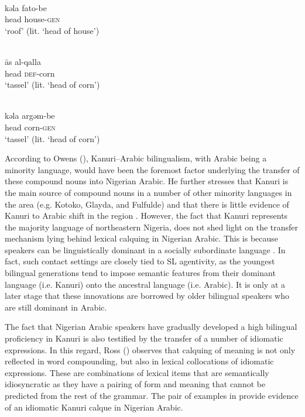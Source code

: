 \documentclass[output=paper]{langsci/langscibook}
\begin{document}
\\
\gll   kǝla fato-be   \\
       head house-\textsc{gen}\\
\glt   `roof' (lit. ‘head of house’)
\z
\z

\ea\label{ex:tassel}
\\
\gll   {\R}ās al-qalla  \\
       head \textsc{def}-corn\\
\glt   `tassel' (lit. ‘head of corn')

\\
\gll   kǝla argǝm-be \\
       head corn-\textsc{gen} \\
\glt   `tassel' (lit. ‘head of corn')
\z
\z

According to Owens (\citeyear[65]{Owens2016idioms}), Kanuri–Arabic bilingualism, with Arabic being a minority language, would have been the foremost factor underlying the transfer of these compound nouns into Nigerian Arabic. He further stresses that Kanuri is the main source of compound nouns in a number of other minority languages in the area (e.g. Kotoko, Glayda, and Fulfulde) and that there is little evidence of Kanuri to Arabic shift in the region \citep[147]{Owens2014}. However, the fact that Kanuri represents the majority language of northeastern Nigeria, does not shed light on the transfer mechanism lying behind lexical calquing in Nigerian Arabic. This is because speakers can be linguistically dominant in a socially subordinate language \citep[376]{Winford2005}. In fact, such contact settings are closely tied to SL agentivity, as the youngest bilingual generations tend to impose semantic features from their dominant language (i.e. Kanuri) onto the ancestral language (i.e. Arabic). It is only at a later stage that these innovations are borrowed by older bilingual speakers who are still dominant in Arabic. 

The fact that Nigerian Arabic speakers have gradually developed a high bilingual proficiency in Kanuri is also testified by the transfer of a number of idiomatic expressions. In this regard, Ross (\citeyear[122]{Ross2007}) observes that calquing of meaning is not only reflected in word compounding, but also in lexical collocations of idiomatic expressions. These are combinations of lexical items that are semantically idiosyncratic as they have a pairing of form and meaning that cannot be predicted from the rest of the grammar. The pair of examples in  provide evidence of an idiomatic Kanuri calque in Nigerian Arabic. 
\end{document}

